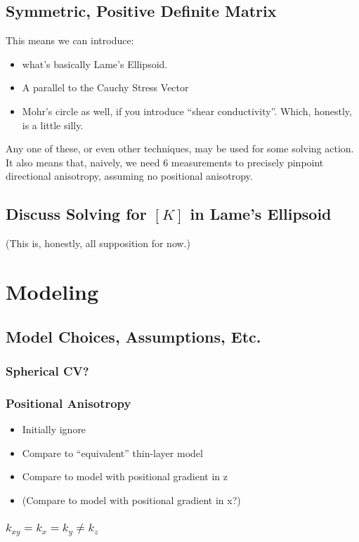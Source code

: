 \documentclass[10pt, letterpaper]{article}
\begin{document}
      \subsection{Symmetric, Positive Definite Matrix}
        This means we can introduce:
        \begin{itemize}
          \item what's basically Lame's Ellipsoid.
          \item A parallel to the Cauchy Stress Vector
          \item Mohr's circle as well, if you introduce ``shear conductivity''. Which, honestly, is a little silly.
        \end{itemize}
        Any one of these, or even other techniques, may be used for some solving action. It also means that, naively, we need 6 measurements to precisely pinpoint directional anisotropy, assuming no positional anisotropy.
      \subsection{Discuss Solving for \([K]\) in Lame's Ellipsoid}
        (This is, honestly, all supposition for now.)
    \section{Modeling}
      \subsection{Model Choices, Assumptions, Etc.}
        \subsubsection{Spherical CV?}
        \subsubsection{Positional Anisotropy}
          \begin{itemize}
            \item Initially ignore
            \item Compare to ``equivalent'' thin-layer model
            \item Compare to model with positional gradient in z
            \item (Compare to model with positional gradient in x?)
          \end{itemize}            
        \subsubsection{\(k_{xy} = k_x = k_y \ne k_z\)}
\end{document}
